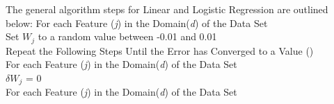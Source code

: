 \documentclass[twoside,11pt]{article}
\newcommand\tab[1][1cm]{\hspace*{#1}}
\begin{document}
The general algorithm steps for Linear and Logistic Regression are outlined below:\newline
For each Feature (\textit{j}) in the Domain(\textit{d}) of the Data Set\\
\tab Set $W_j$ to a random value between -0.01 and 0.01\\
Repeat the Following Steps Until the Error has Converged to a Value ()\\
\tab For each Feature (\textit{j}) in the Domain(\textit{d}) of the Data Set\\
\tab \tab $\delta W_j$ = 0\\
 \tab For each Feature (\textit{j}) in the Domain(\textit{d}) of the Data Set\\
 
\end{document}
